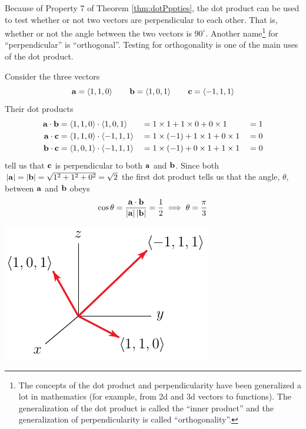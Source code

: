 Because of Property 7 of Theorem \ref{thm:dotPppties}, the dot product 
can be used to test whether or not two vectors are perpendicular to 
each other. That is, whether or not the angle between the two vectors 
is $90^\circ$. Another name\footnote{The concepts of the dot product
and perpendicularity have been generalized a lot in mathematics (for example,
from 2d and 3d vectors to functions). The generalization of the dot 
product is called the ``inner product'' and the generalization 
of perpendicularity is called ``orthogonality''.} for ``perpendicular'' 
is ``orthogonal''. Testing for orthogonality is one of the main uses of the
dot product. 

\begin{eg}
Consider the three vectors
\begin{equation*}
\mathbf{a}=\left< 1,1,0 \right>\qquad
\mathbf{b}=\left< 1,0,1 \right> \qquad
\mathbf{c}=\left< -1,1,1\right>
\end{equation*}
Their dot products
\begin{alignat*}{3}
\mathbf{a}\cdot\mathbf{b} & = \left< 1,1,0 \right> \cdot \left< 1,0,1 \right>
           && = 1\times 1 +1\times 0+0\times 1
           && = 1 \\
\mathbf{a}\cdot\mathbf{c} & = \left< 1,1,0 \right> \cdot \left< -1,1,1 \right>
           && = 1\times(-1) +1\times 1+0\times 1
           && = 0 \\
\mathbf{b}\cdot\mathbf{c} & = \left< 1,0,1 \right> \cdot \left< -1,1,1 \right>
           && = 1\times(-1) +0\times 1+1\times 1
           && = 0
\end{alignat*}
tell us that $\mathbf{c}$ is perpendicular to both $\mathbf{a}$ and $\mathbf{b}$.
Since both $|\mathbf{a}|=|\mathbf{b}|=\sqrt{1^2+1^2+0^2}=\sqrt{2}$ the first dot product
tells us that the angle, $\theta$, between $\mathbf{a}$ and $\mathbf{b}$ obeys
\begin{align*}
\cos\theta =\frac{\mathbf{a}\cdot\mathbf{b}}{|\mathbf{a}|\,|\mathbf{b}|}=\frac{1}{2}
\implies
\theta =\frac{\pi}{3}
\end{align*}

\begin{efig}
  \begin{center}
  \includegraphics{dotProd.pdf}
  \end{center}
\end{efig}

\end{eg}
\goodbreak


